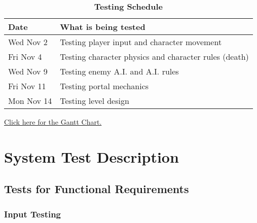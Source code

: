 \documentclass[12pt, titlepage]{article}
\begin{document}
\begin{table}[hbp]
\caption{\textbf{Testing Schedule}} \label{Table}

\begin{tabularx}{\textwidth}{p{3cm}X}
\toprule
\textbf{Date} & \textbf{What is being tested} \\
\midrule
	Wed Nov 2 &	Testing player input and character movement \\
	Fri Nov 4 & Testing character physics and character rules (death)\\
	Wed Nov 9 & Testing enemy A.I. and A.I. rules\\
	Fri Nov 11 & Testing portal mechanics\\
	Mon Nov 14 & Testing level design\\
\bottomrule
\end{tabularx}
\end{table}

\href{run:../../ProjectSchedule/ProjectSchedule.gan}{Click here for the Gantt Chart.}

\section{System Test Description}
	
\subsection{Tests for Functional Requirements}

\subsubsection{Input Testing}
\end{document}
